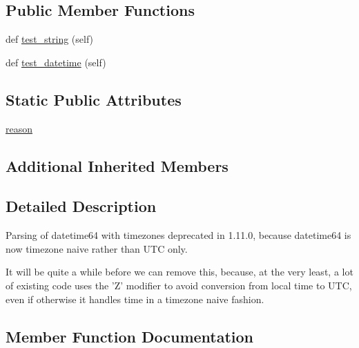 \subsection*{Public Member Functions}
\begin{DoxyCompactItemize}
\item 
def \hyperlink{classnumpy_1_1core_1_1tests_1_1test__deprecations_1_1TestDatetime64Timezone_a4362dcd710bdca7e7018e879fe6134d0}{test\+\_\+string} (self)
\item 
def \hyperlink{classnumpy_1_1core_1_1tests_1_1test__deprecations_1_1TestDatetime64Timezone_a10e963b326498925c43a2a06dc46cc69}{test\+\_\+datetime} (self)
\end{DoxyCompactItemize}
\subsection*{Static Public Attributes}
\begin{DoxyCompactItemize}
\item 
\hyperlink{classnumpy_1_1core_1_1tests_1_1test__deprecations_1_1TestDatetime64Timezone_a721c0365323c9aef88b5aa6765a230a6}{reason}
\end{DoxyCompactItemize}
\subsection*{Additional Inherited Members}


\subsection{Detailed Description}
\begin{DoxyVerb}Parsing of datetime64 with timezones deprecated in 1.11.0, because
datetime64 is now timezone naive rather than UTC only.

It will be quite a while before we can remove this, because, at the very
least, a lot of existing code uses the 'Z' modifier to avoid conversion
from local time to UTC, even if otherwise it handles time in a timezone
naive fashion.
\end{DoxyVerb}
 

\subsection{Member Function Documentation}
\mbox{\label{classnumpy_1_1core_1_1tests_1_1test__deprecations_1_1TestDatetime64Timezone_a10e963b326498925c43a2a06dc46cc69}} 

